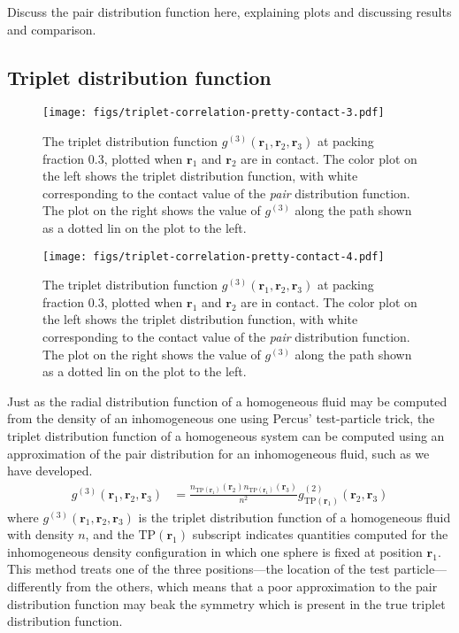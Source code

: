 \documentclass[letterpaper,twocolumn,amsmath,amssymb,pre,aps,10pt]{revtex4-1}
\newcommand{\rr}{\textbf{r}}
\begin{document}
Discuss the pair distribution function here, explaining plots
  and discussing results and comparison.

\subsection{Triplet distribution function}

\begin{figure}
  \texttt{[image: figs/triplet-correlation-pretty-contact-3.pdf]}
  \caption{The triplet distribution function
    $g^{(3)}(\rr_1,\rr_2,\rr_3)$ at packing fraction 0.3, plotted when
    $\rr_1$ and $\rr_2$ are in contact.  The color plot on the left
    shows the triplet distribution function, with white corresponding
    to the contact value of the \emph{pair} distribution function.
    The plot on the right shows the value of $g^{(3)}$ along the path
    shown as a dotted lin on the plot to the
    left.}\label{fig:triplet-contact-distribution-3}
\end{figure}
\begin{figure}
  \texttt{[image: figs/triplet-correlation-pretty-contact-4.pdf]}
  \caption{The triplet distribution function
    $g^{(3)}(\rr_1,\rr_2,\rr_3)$ at packing fraction 0.3, plotted when
    $\rr_1$ and $\rr_2$ are in contact.  The color plot on the left
    shows the triplet distribution function, with white corresponding
    to the contact value of the \emph{pair} distribution function.
    The plot on the right shows the value of $g^{(3)}$ along the path
    shown as a dotted lin on the plot to the
    left.}\label{fig:triplet-contact-distribution-4}
\end{figure}

Just as the radial distribution function of a homogeneous fluid may be
computed from the density of an inhomogeneous one using Percus'
test-particle trick, the triplet distribution function of a
homogeneous system can be computed using an approximation of the pair
distribution for an inhomogeneous fluid, such as we have developed.
\begin{align}
  g^{(3)}(\rr_1,\rr_2,\rr_3) &= \frac{n_{\textrm{TP}(\rr_1)}(\rr_2)
  n_{\textrm{TP}(\rr_1)}(\rr_3)}{n^2}
  g^{(2)}_{\textrm{TP}(\rr_1)}(\rr_2,\rr_3)
\end{align}
where $g^{(3)}(\rr_1,\rr_2,\rr_3)$ is the triplet distribution
function of a homogeneous fluid with density $n$, and the
$\textrm{TP}(\rr_1)$ subscript indicates quantities computed for the
inhomogeneous density configuration in which one sphere is fixed at
position $\rr_1$.  This method treats one of the three positions---the
location of the test particle---differently from the others, which
means that a poor approximation to the pair distribution function may
beak the symmetry which is present in the true triplet distribution
function.
\end{document}
